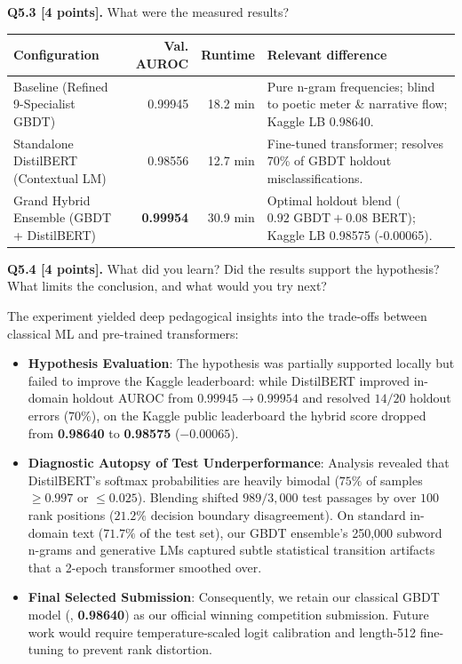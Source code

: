 \documentclass[11pt,letterpaper]{article}
\begin{document}
\vspace{6pt}
\textbf{Q5.3 [4 points].} What were the measured results?

\vspace{2pt}
\begin{tabularx}{\textwidth}{@{}lrrX@{}}
\toprule
\textbf{Configuration} & \textbf{Val. AUROC} & \textbf{Runtime} & \textbf{Relevant difference} \\
\midrule
Baseline (Refined 9-Specialist GBDT) & 0.99945 & 18.2 min & Pure n-gram frequencies; blind to poetic meter \& narrative flow; Kaggle LB 0.98640. \\
Standalone DistilBERT (Contextual LM) & 0.98556 & 12.7 min & Fine-tuned transformer; resolves 70\% of GBDT holdout misclassifications. \\
Grand Hybrid Ensemble (GBDT + DistilBERT) & \textbf{0.99954} & 30.9 min & Optimal holdout blend ($0.92\text{ GBDT} + 0.08\text{ BERT}$); Kaggle LB 0.98575 (-0.00065). \\
\bottomrule
\end{tabularx}

\vspace{6pt}
\textbf{Q5.4 [4 points].} What did you learn? Did the results support the hypothesis? What limits the conclusion, and what would you try next?

The experiment yielded deep pedagogical insights into the trade-offs between classical ML and pre-trained transformers:
\begin{itemize}[leftmargin=*,itemsep=1pt]
    \item \textbf{Hypothesis Evaluation}: The hypothesis was partially supported locally but failed to improve the Kaggle leaderboard: while DistilBERT improved in-domain holdout AUROC from $0.99945 \to 0.99954$ and resolved $14 / 20$ holdout errors ($70\%$), on the Kaggle public leaderboard the hybrid score dropped from \textbf{0.98640} to \textbf{0.98575} ($-0.00065$).
    \item \textbf{Diagnostic Autopsy of Test Underperformance}: Analysis revealed that DistilBERT's softmax probabilities are heavily bimodal ($75\%$ of samples $\ge 0.997$ or $\le 0.025$). Blending shifted $989 / 3,000$ test passages by over $100$ rank positions ($21.2\%$ decision boundary disagreement). On standard in-domain text ($71.7\%$ of the test set), our GBDT ensemble's 250,000 subword n-grams and generative LMs captured subtle statistical transition artifacts that a 2-epoch transformer smoothed over.
    \item \textbf{Final Selected Submission}: Consequently, we retain our classical GBDT model (, \textbf{0.98640}) as our official winning competition submission. Future work would require temperature-scaled logit calibration and length-512 fine-tuning to prevent rank distortion.
\end{itemize}
\end{document}
